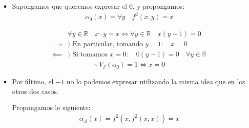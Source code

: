 \begin{itemize}
\begin{itemize}
        Interpretando $\alpha_1$:
        \begin{align*}
            & \forall y \in \mathbb{R} \quad x \cdot y = y 
            \iff \forall y \in \mathbb{R} \quad (x-1) y = 0 \\
            \implies) & \notamath{En particular para $y = 3$}
            3 (x-1) = 0 \\
            &\implies x = 1 \\
            \impliedby) & \notamath{x = 1}
            (1-1) y = 0 \quad \forall y \in \mathbb{R} \\
        \end{align*}
        \begin{gather*}
            \therefore ~ V_{\mathcal{I}, v_{x=1}}(\alpha_1(x)) = 1 \iff x = 1
        \end{gather*}

        Entonces la fórmula $\alpha_1(x)$ expresa $B = \{ 1 \}$. Es decir,
        $B$ es expresable en $\mathcal{I}$.


        No es lo que me pedían en este ejercicio, pero nos damos cuenta que 
        al 1 lo podemos describir de esta forma.


        \item Supongamos que queremos expresar el 0, y propongamos:
        \begin{gather*}
            \alpha_0(x) = \forall y \quad f^2(x,y) = x
        \end{gather*}

        \begin{align*}
            & \forall y \in \mathbb{R} \quad x \cdot y = x \iff \forall y \in
            \mathbb{R} \quad x(y-1) = 0 \\
            \implies & ) \text{ En particular, tomando } y = 1: \quad x = 0 \\
            \impliedby & ) \text{ Si tomamos } x = 0: \quad 0(y-1) = 0 \quad
            \forall y \in \mathbb{R}
        \end{align*}
        \begin{gather*}
            \therefore ~ V_{\mathcal{I}}(\alpha_0) = 1 \iff x = 0
        \end{gather*}


        \item Por último, el $-1$ no lo podemos expresar utilizando la misma 
        idea que en los otros dos casos.

        Propongamos lo siguiente:
        \begin{gather*}
            \alpha_A(x) = f^2 (x, f^2 (x,x)) = x
        \end{gather*}


\end{itemize}
\end{itemize}
